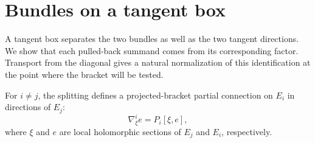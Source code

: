 \section{Bundles on a tangent box}\label{sec:transport}

A tangent box separates the two bundles as well as the two tangent
directions. We show that each pulled-back summand comes from its
corresponding factor. Transport from the diagonal gives a natural
normalization of this identification at the point where the bracket
will be tested.

For \(i\ne j\), the splitting defines a projected-bracket partial
connection on \(E_i\) in directions of \(E_j\):
\begin{equation}\label{eq:partial}
\nabla^i_\xi e=P_i[\xi,e],
\end{equation}
where \(\xi\) and \(e\) are local holomorphic sections of \(E_j\)
and \(E_i\), respectively.


